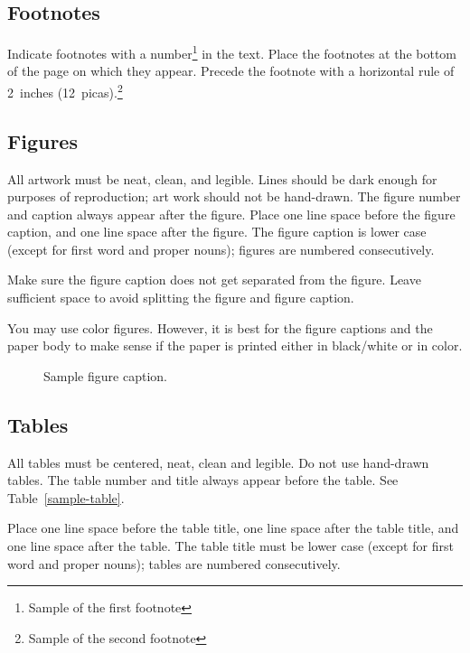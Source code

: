 \documentclass{article} %
\begin{document}
\subsection{Footnotes}

Indicate footnotes with a number\footnote{Sample of the first footnote} in the
text. Place the footnotes at the bottom of the page on which they appear.
Precede the footnote with a horizontal rule of 2~inches
(12~picas).\footnote{Sample of the second footnote}

\subsection{Figures}

All artwork must be neat, clean, and legible. Lines should be dark
enough for purposes of reproduction; art work should not be
hand-drawn. The figure number and caption always appear after the
figure. Place one line space before the figure caption, and one line
space after the figure. The figure caption is lower case (except for
first word and proper nouns); figures are numbered consecutively.

Make sure the figure caption does not get separated from the figure.
Leave sufficient space to avoid splitting the figure and figure caption.

You may use color figures.
However, it is best for the
figure captions and the paper body to make sense if the paper is printed
either in black/white or in color.
\begin{figure}[h]
\begin{center}
\fbox{\rule[-.5cm]{0cm}{4cm} \rule[-.5cm]{4cm}{0cm}}
\end{center}
\caption{Sample figure caption.}
\end{figure}

\subsection{Tables}

All tables must be centered, neat, clean and legible. Do not use hand-drawn
tables. The table number and title always appear before the table. See
Table~\ref{sample-table}.

Place one line space before the table title, one line space after the table
title, and one line space after the table. The table title must be lower case
(except for first word and proper nouns); tables are numbered consecutively.
\end{document}
